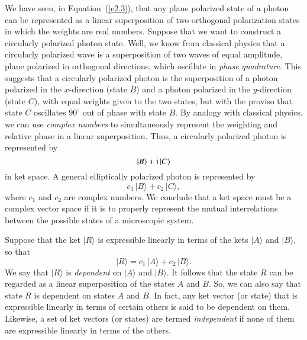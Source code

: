 We have seen, in Equation~(\ref{e2.3}),
 that any plane polarized state of a photon can be represented
as a linear superposition of two orthogonal polarization states
in which the weights are real numbers. Suppose that
we want to construct a circularly polarized photon state. Well, we know from
classical physics that a circularly polarized wave is a superposition of two
waves of equal amplitude, plane polarized in orthogonal directions, 
which oscillate in {\em phase quadrature}. This suggests that a circularly polarized photon
is the superposition of a photon polarized in the $x$-direction (state $B$)
and a photon polarized in the $y$-direction (state $C$), with equal weights given
to the two states, but with the proviso that state $C$ oscillates $90^\circ$ out of phase
with state $B$. By analogy with classical physics, we can use {\em complex numbers}\/
to simultaneously represent the  weighting and relative phase in a
linear superposition. Thus, a circularly polarized photon is represented by
\begin{equation}
|B\rangle + {\rm i}\, |C\rangle
\end{equation}
in ket space. A general elliptically polarized photon is represented by
\begin{equation}
c_1\, |B\rangle + c_2\, |C\rangle,
\end{equation}
where $c_1$ and $c_2$ are  complex numbers. We conclude that
a ket space
must be a complex vector space if it is to properly 
represent the mutual interrelations
between the possible states of a microscopic system. 

Suppose that the ket $|R\rangle$ is expressible linearly in terms of the kets
$|A\rangle$ and $|B\rangle$, so that
\begin{equation}
|R\rangle = c_1\, |A\rangle + c_2 \,|B\rangle.
\end{equation}
We say that $|R\rangle$ is {\em dependent}\/ on $|A\rangle$ and $|B\rangle$. It follows that
the state $R$ can be regarded as a linear superposition of 
the states $A$ and $B$.
So, we can also say that state $R$ is dependent on states $A$ and $B$. 
In fact, any ket vector (or state) that  is expressible linearly in
terms of certain others is said to be dependent on them. Likewise, a
set of ket vectors (or states) are termed {\em independent}\/ if none of
them are expressible linearly in terms of the others.

